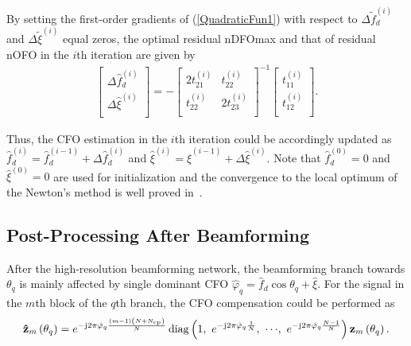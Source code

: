\documentclass[12pt, draftclsnofoot, onecolumn]{IEEEtran}
\begin{document}
By setting the first-order gradients of (\ref{QuadraticFun1}) with respect to $\Delta {\tilde{f}_{d}^{\left( i \right)}}$ and $\Delta \tilde{\xi}^{\left( i \right)} $ equal zeros, the optimal residual nDFOmax and that of residual nOFO in the $i$th iteration are given by
\begin{align} \label{CFOSolution}
\left[ \begin{matrix}
   \Delta \hat{f}_{d}^{\left( i \right)}  \\
   \Delta \hat{\xi}^{\left( i \right)}  \\
\end{matrix} \right]=-{{\left[ \begin{matrix}
   2{{t}_{21}^{\left( i \right)}} & {{t}_{22}^{\left( i \right)}}  \\
   {{t}_{22}^{\left( i \right)}} & 2{{t}_{23}^{\left( i \right)}}  \\
\end{matrix} \right]}^{-1}}\left[ \begin{matrix}
   {{t}_{11}^{\left( i \right)}}  \\
   {{t}_{12}^{\left( i \right)}}  \\
\end{matrix} \right].
\end{align}

Thus, the CFO estimation in the $i$th iteration could be accordingly updated as $\hat{f}_{d}^{\left( i \right)} \!=\! \hat{f}_{d}^{\left( i-1 \right)} \!+\! \Delta \hat{f}_{d}^{\left( i \right)}$ and $\hat{\xi}^{\left( i \right)} \!=\! \hat{\xi}^{\left( i-1 \right)} \!+\! \Delta \hat{\xi}^{\left( i \right)}$.
Note that $\hat{f}_{d}^{\left( 0 \right)} \!=\! 0$ and $\hat{\xi}^{\left( 0 \right)} \!=\! 0$ are used for initialization and the convergence to the local optimum of the Newton's method is well proved in~\cite{S_Boyd2004}.

\vspace{-0.6em}
\subsection{Post-Processing After Beamforming}
After the high-resolution beamforming network, the beamforming branch towards $\theta_q$ is mainly affected by single dominant CFO ${\hat{\varphi}_{q}} ={{\hat{f}}_{d}}\cos {{\theta }_{q}}+\hat{\xi }$. For the signal in the $m$th block of the $q$th branch, the CFO compensation could be performed as
\begin{align}
 {{\mathbf{\hat{z}}}_{m}}\left( {{\theta }_{q}} \right) ={{e}^{-\text{j}2{\rm  \pi} \hat{\varphi}_{q} \frac{\left( m-1 \right)\left( N+{{N}_{\mathrm{cp}}} \right)}{N}}} \operatorname{diag}\left( 1,\ {{e}^{-\text{j}2{\rm \pi} \hat{\varphi}_{q}\frac{1}{N}}},\ \cdots \!,\ {{e}^{-\text{j}2{\rm \pi} \hat{\varphi}_{q}\frac{N-1}{N}}} \right){{\mathbf{z}}_{m}}\left( {{\theta }_{q}} \right).
\end{align}
\end{document}
